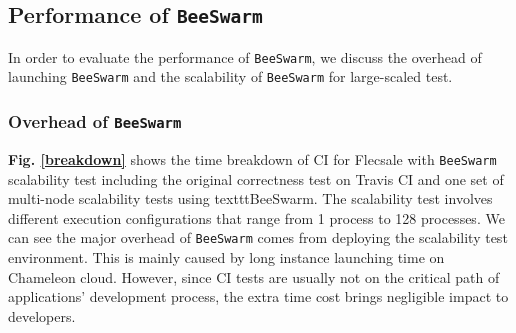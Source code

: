 \subsection{Performance of \texttt{BeeSwarm}}

In order to evaluate the performance of \texttt{BeeSwarm}, we discuss the overhead of launching \texttt{BeeSwarm} and the scalability of \texttt{BeeSwarm} for large-scaled test.

\subsubsection{Overhead of \texttt{BeeSwarm}}
\textbf{Fig. \ref{breakdown}} shows the time breakdown of CI for Flecsale with \texttt{BeeSwarm} scalability test including the original correctness test on Travis CI and one set of multi-node scalability tests using texttt{BeeSwarm}. The scalability test involves different execution configurations that range from 1 process to 128 processes. We can see the major overhead of \texttt{BeeSwarm} comes from deploying the scalability test environment. This is mainly caused by long instance launching time on Chameleon cloud. However, since CI tests are usually not on the critical path of applications' development process, the extra time cost brings negligible impact to developers.   %


